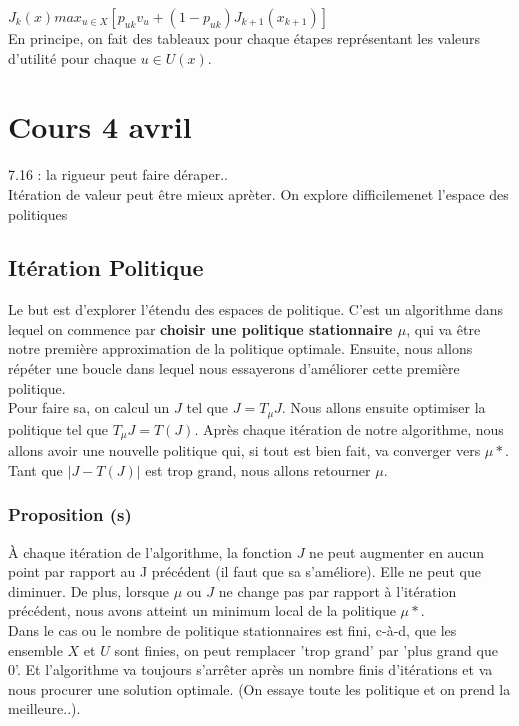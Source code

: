 \documentclass[oneside]{book}
\begin{document}
$J_k(x) max_{u \in X}[p_{uk}v_u + (1 - p_{uk})J_{k+1}(x_{k+1}) ]$\\

\justify
En principe, on fait des tableaux pour chaque étapes représentant les valeurs d'utilité pour chaque $u \in U(x)$.\\

\chapter{Cours 4 avril}
7.16 : la rigueur peut faire déraper.. \\

Itération de valeur peut être mieux aprèter. On explore difficilemenet l'espace des politiques
\section{Itération Politique}
Le but est d'explorer l'étendu des espaces de politique. C'est un algorithme dans lequel on commence par \textbf{choisir une politique stationnaire $\mu$}, qui va être notre première approximation de la politique optimale. Ensuite, nous allons répéter une boucle dans lequel nous essayerons d'améliorer cette première politique.\\

Pour faire sa, on calcul un $J$ tel que $J = T_{\mu}J$. Nous allons ensuite optimiser la politique tel que $T_{\mu}J = T(J)$. Après chaque itération de notre algorithme, nous allons avoir une nouvelle politique qui, si tout est bien fait, va converger vers $\mu*$. \\

Tant que $|J - T(J)|$ est trop grand, nous allons retourner $\mu$.\\

\subsection{Proposition (s)}
À chaque itération de l'algorithme, la fonction $J$ ne peut augmenter en aucun point par rapport au J précédent (il faut que sa s'améliore). Elle ne peut que diminuer. De plus, lorsque $\mu $ ou $ J $ ne change pas par rapport à l'itération précédent, nous avons atteint un minimum local de la politique $\mu*$.\\

Dans le cas ou le nombre de politique stationnaires est fini, c-à-d, que les ensemble $X$ et $U$ sont finies, on peut remplacer 'trop grand' par 'plus grand que 0'. Et l'algorithme va toujours s'arrêter après un nombre finis d'itérations et va nous procurer une solution optimale. (On essaye toute les politique et on prend la meilleure..). \\
\end{document}

